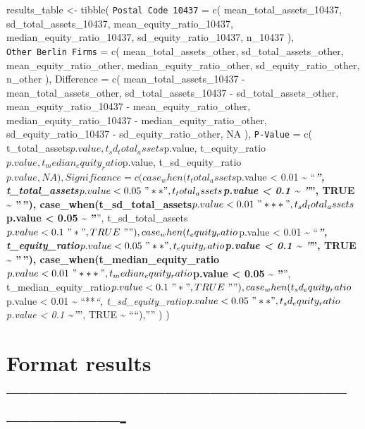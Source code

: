 \documentclass[
]{article}
\begin{document}
results\_table \textless- tibble( \texttt{Postal\ Code\ 10437} = c(
mean\_total\_assets\_10437, sd\_total\_assets\_10437,
mean\_equity\_ratio\_10437, median\_equity\_ratio\_10437,
sd\_equity\_ratio\_10437, n\_10437 ), \texttt{Other\ Berlin\ Firms} = c(
mean\_total\_assets\_other, sd\_total\_assets\_other,
mean\_equity\_ratio\_other, median\_equity\_ratio\_other,
sd\_equity\_ratio\_other, n\_other ), Difference = c(
mean\_total\_assets\_10437 - mean\_total\_assets\_other,
sd\_total\_assets\_10437 - sd\_total\_assets\_other,
mean\_equity\_ratio\_10437 - mean\_equity\_ratio\_other,
median\_equity\_ratio\_10437 - median\_equity\_ratio\_other,
sd\_equity\_ratio\_10437 - sd\_equity\_ratio\_other, NA ),
\texttt{P-Value} = c(
t\_total\_assets\(p.value,  t_sd_total_assets\)p.value,
t\_equity\_ratio\(p.value,  t_median_equity_ratio\)p.value,
t\_sd\_equity\_ratio\(p.value,  NA  ),  Significance = c(  case_when(t_total_assets\)p.value
\textless{} 0.01 \textasciitilde{} ``\textbf{\emph{'',
t\_total\_assets\(p.value < 0.05 ~ "**", t_total_assets\)p.value
\textless{} 0.1 \textasciitilde{} ''}'', TRUE \textasciitilde{} ''\,''),
case\_when(t\_sd\_total\_assets\(p.value < 0.01 ~ "***", t_sd_total_assets\)p.value
\textless{} 0.05 \textasciitilde{} ''}'',
t\_sd\_total\_assets\(p.value < 0.1 ~ "*", TRUE ~ ""),  case_when(t_equity_ratio\)p.value
\textless{} 0.01 \textasciitilde{} ``\textbf{\emph{'',
t\_equity\_ratio\(p.value < 0.05 ~ "**", t_equity_ratio\)p.value
\textless{} 0.1 \textasciitilde{} ''}'', TRUE \textasciitilde{} ''\,''),
case\_when(t\_median\_equity\_ratio\(p.value < 0.01 ~ "***", t_median_equity_ratio\)p.value
\textless{} 0.05 \textasciitilde{} ''}'',
t\_median\_equity\_ratio\(p.value < 0.1 ~ "*", TRUE ~ ""),  case_when(t_sd_equity_ratio\)p.value
\textless{} 0.01 \textasciitilde{} ``**\emph{``,
t\_sd\_equity\_ratio\(p.value < 0.05 ~ "**", t_sd_equity_ratio\)p.value
\textless{} 0.1 \textasciitilde{}''}'', TRUE \textasciitilde{}
````),'''' ) )

\hypertarget{format-results--}{%
\section{Format results
-------------------------------------------------------------}\label{format-results--}}
\end{document}
